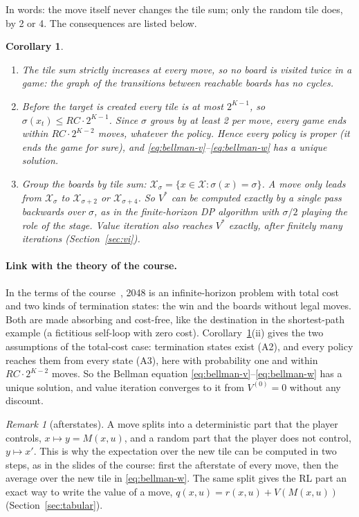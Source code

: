 \documentclass[11pt,a4paper]{article}
\newtheorem{corollary}{Corollary}
\theoremstyle{remark}
\newtheorem*{remark}{Remark}
\newcommand{\X}{\mathcal{X}}
\begin{document}
In words: the move itself never changes the tile sum; only the random tile does, by 2 or 4. The consequences are listed below.

\begin{corollary}\label{cor:dag}
\begin{enumerate}[label=(\roman*)]
\item The tile sum strictly increases at every move, so no board is visited twice in a game: the graph of the transitions between reachable boards has no cycles.
\item Before the target is created every tile is at most $2^{K-1}$, so $\sigma(x_t)\le RC\cdot 2^{K-1}$. Since $\sigma$ grows by at least 2 per move, every game ends within $RC\cdot 2^{K-2}$ moves, whatever the policy. Hence every policy is proper (it ends the game for sure), and \eqref{eq:bellman-v}--\eqref{eq:bellman-w} has a unique solution.
\item Group the boards by tile sum: $\X_\sigma=\{x\in\X:\sigma(x)=\sigma\}$. A move only leads from $\X_\sigma$ to $\X_{\sigma+2}$ or $\X_{\sigma+4}$. So $V^*$ can be computed exactly by a single pass backwards over $\sigma$, as in the finite-horizon DP algorithm with $\sigma/2$ playing the role of the stage. Value iteration also reaches $V^*$ exactly, after finitely many iterations (Section~\ref{sec:vi}).
\end{enumerate}
\end{corollary}

\paragraph{Link with the theory of the course.} In the terms of the course~\cite{bertsekas2019}, 2048 is an infinite-horizon problem with total cost and two kinds of termination states: the win and the boards without legal moves. Both are made absorbing and cost-free, like the destination in the shortest-path example (a fictitious self-loop with zero cost). Corollary~\ref{cor:dag}(ii) gives the two assumptions of the total-cost case: termination states exist (A2), and every policy reaches them from every state (A3), here with probability one and within $RC\cdot2^{K-2}$ moves. So the Bellman equation \eqref{eq:bellman-v}--\eqref{eq:bellman-w} has a unique solution, and value iteration converges to it from $V^{(0)}=0$ without any discount.

\begin{remark}[afterstates]
A move splits into a deterministic part that the player controls, $x\mapsto y=M(x,u)$, and a random part that the player does not control, $y\mapsto x'$. This is why the expectation over the new tile can be computed in two steps, as in the slides of the course: first the afterstate of every move, then the average over the new tile in \eqref{eq:bellman-w}. The same split gives the RL part an exact way to write the value of a move, $q(x,u)=r(x,u)+V(M(x,u))$ (Section~\ref{sec:tabular}).
\end{remark}
\end{document}
